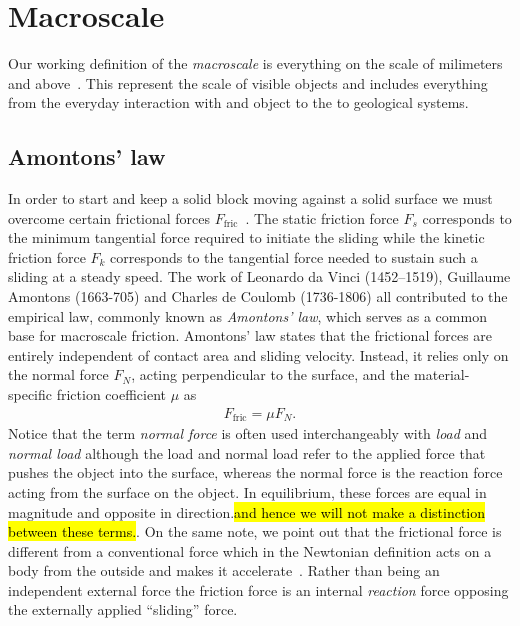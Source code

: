 \section{Macroscale}\label{sec:macroscale}
Our working definition of the \textit{macroscale} is everything on the scale of milimeters and above~\cite{HUNG2015215}. This represent the scale of visible objects and includes everything from the everyday interaction with and object to the to geological systems. 




\subsection{Amontons’ law}
In order to start and keep a solid block moving against a solid surface we must
overcome certain frictional forces $F_{\text{fric}}$~\cite{gnecco_meyer_2015}.
The static friction force $F_s$ corresponds to the minimum tangential force
required to initiate the sliding while the kinetic friction force $F_k$
corresponds to the tangential force needed to sustain such a sliding at a steady
speed. The work of Leonardo da Vinci (1452–1519), Guillaume Amontons (1663-705)
and Charles de Coulomb (1736-1806) all contributed to the empirical law,
commonly known as \textit{Amontons’ law}, which serves as a common base for macroscale
friction. Amontons’ law states that the frictional forces are entirely
independent of contact area and sliding velocity. Instead, it relies only on
the normal force $F_N$, acting perpendicular to the surface, and the material-specific friction coefficient $\mu$ as
\begin{align}
  F_{\text{fric}} = \mu F_N.
  \label{eq:amonton}
\end{align}
Notice that the term \textit{normal force} is often used interchangeably with \textit{load} and \textit{normal load} although the load and normal load refer to the applied force that pushes the object into the surface, whereas the normal force is the reaction force acting from the surface on the object. In equilibrium, these forces are equal in magnitude and opposite in direction.\hl{and hence we will not make a distinction between these terms.}. On the same note, we point out that the frictional force is different from a conventional force which in the Newtonian definition acts on a body from the outside and makes it accelerate~\cite{gao_frictional_2004}. Rather than being an independent external force the friction force is an internal \textit{reaction} force opposing the externally applied ``sliding'' force. 


